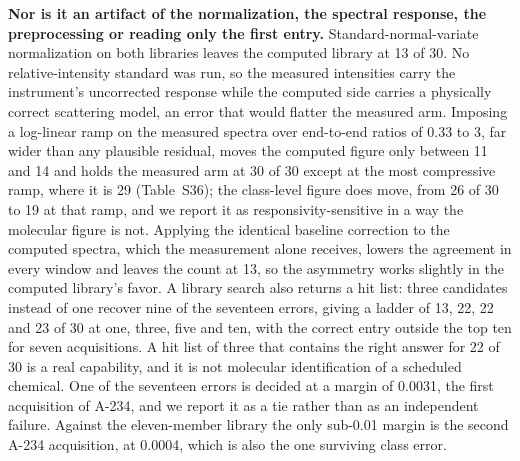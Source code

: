 \documentclass[review,12pt]{elsarticle}
\begin{document}
\textbf{Nor is it an artifact of the normalization, the spectral response, the
preprocessing or reading only the first entry.} Standard-normal-variate normalization on
both libraries leaves the computed library at 13 of 30. No relative-intensity standard was
run, so the measured intensities carry the instrument's uncorrected response while the
computed side carries a physically correct scattering model, an error that would flatter
the measured arm. Imposing a log-linear ramp on the measured spectra over end-to-end ratios
of 0.33 to 3, far wider than any plausible residual, moves the computed figure only between
11 and 14 and holds the measured arm at 30 of 30 except at the most compressive ramp, where
it is 29 (Table~S36); the class-level figure does move, from 26 of 30 to 19 at that
ramp, and we report it as responsivity-sensitive in a way the molecular figure is not.
Applying the identical baseline correction to the computed spectra, which the measurement
alone receives, lowers the agreement in every window and leaves the count at 13, so the
asymmetry works slightly in the computed library's favor. A library search also returns a
hit list: three candidates instead of one recover nine of the seventeen errors, giving a
ladder of 13, 22, 22 and 23 of 30 at one, three, five and ten, with the correct entry
outside the top ten for seven acquisitions. A hit list of three that contains the right
answer for 22 of 30 is a real capability, and it is not molecular identification of a
scheduled chemical. One of the seventeen errors is decided at a margin of 0.0031, the first
acquisition of A-234, and we report it as a tie rather than as an independent failure. Against the
eleven-member library the only sub-0.01 margin is the second A-234 acquisition, at 0.0004,
which is also the one surviving class error.
\end{document}

